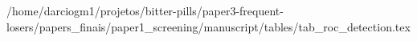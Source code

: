 /home/darciogm1/projetos/bitter-pills/paper3-frequent-losers/papers_finais/paper1_screening/manuscript/tables/tab_roc_detection.tex
